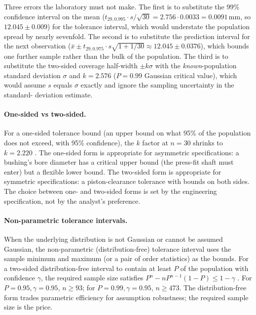 Three errors the laboratory must not make. The first is to substitute
the 99\% confidence interval on the mean
($t_{29, 0.995} \cdot s/\sqrt{30} = 2.756 \cdot 0.0033 = 0.0091
\,\si{\milli\meter}$, so $12.045 \pm 0.009$) for the tolerance
interval, which would understate the population spread by nearly
sevenfold. The second is to substitute the prediction interval for
the next observation ($\bar{x} \pm t_{29, 0.975} \cdot s\sqrt{1 +
1/30} \approx 12.045 \pm 0.0376$), which bounds one further sample
rather than the bulk of the population. The third is to substitute
the two-sided coverage half-width $\pm k \sigma$ with the
\emph{known}-population standard deviation $\sigma$ and $k = 2.576$
($P = 0.99$ Gaussian critical value), which would assume $s$ equals
$\sigma$ exactly and ignore the sampling uncertainty in the standard-
deviation estimate.

\paragraph{One-sided vs two-sided.} For a one-sided tolerance bound
(an upper bound on what 95\% of the population does not exceed, with
95\% confidence), the $k$ factor at $n = 30$ shrinks to $k = 2.220$
\cite{std:ch04t3-iso16269-6}. The one-sided form is appropriate for
asymmetric specifications: a bushing's bore diameter has a critical
upper bound (the press-fit shaft must enter) but a flexible lower
bound. The two-sided form is appropriate for symmetric specifications:
a piston-clearance tolerance with bounds on both sides. The choice
between one- and two-sided forms is set by the engineering
specification, not by the analyst's preference.

\paragraph{Non-parametric tolerance intervals.} When the underlying
distribution is not Gaussian or cannot be assumed Gaussian, the
non-parametric (distribution-free) tolerance interval uses the
sample minimum and maximum (or a pair of order statistics) as the
bounds. For a two-sided distribution-free interval to contain at
least $P$ of the population with confidence $\gamma$, the required
sample size satisfies $P^{n} - n P^{n-1}(1 - P) \leq 1 - \gamma$
\cite{std:ch04t3-iso16269-6}. For $P = 0.95, \gamma = 0.95$,
$n \geq 93$; for $P = 0.99, \gamma = 0.95$, $n \geq 473$. The
distribution-free form trades parametric efficiency for assumption
robustness; the required sample size is the price.

